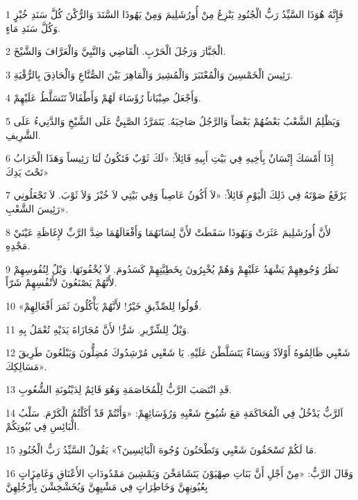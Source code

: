 \par 1 فَإِنَّهُ هُوَذَا السَّيِّدُ رَبُّ الْجُنُودِ يَنْزِعُ مِنْ أُورُشَلِيمَ وَمِنْ يَهُوذَا السَّنَدَ وَالرُّكْنَ كُلَّ سَنَدِ خُبْزٍ وَكُلَّ سَنَدِ مَاءٍ.
\par 2 الْجَبَّارَ وَرَجُلَ الْحَرْبِ. الْقَاضِي وَالنَّبِيَّ وَالْعَرَّافَ وَالشَّيْخَ.
\par 3 رَئِيسَ الْخَمْسِينَ وَالْمُعْتَبَرَ وَالْمُشِيرَ وَالْمَاهِرَ بَيْنَ الصُّنَّاعِ وَالْحَاذِقَ بِالرُّقْيَةِ.
\par 4 وَأَجْعَلُ صِبْيَاناً رُؤَسَاءَ لَهُمْ وَأَطْفَالاً تَتَسَلَّطُ عَلَيْهِمْ.
\par 5 وَيَظْلِمُ الشَّعْبُ بَعْضُهُمْ بَعْضاً وَالرَّجُلُ صَاحِبَهُ. يَتَمَرَّدُ الصَّبِيُّ عَلَى الشَّيْخِ وَالدَّنِيءُ عَلَى الشَّرِيفِ.
\par 6 إِذَا أَمْسَكَ إِنْسَانٌ بِأَخِيهِ فِي بَيْتِ أَبِيهِ قَائِلاً: «لَكَ ثَوْبٌ فَتَكُونُ لَنَا رَئِيساً وَهَذَا الْخَرَابُ تَحْتَ يَدِكَ»
\par 7 يَرْفَعُ صَوْتَهُ فِي ذَلِكَ الْيَوْمِ قَائِلاً: «لاَ أَكُونُ عَاصِباً وَفِي بَيْتِي لاَ خُبْزَ وَلاَ ثَوْبَ. لاَ تَجْعَلُونِي رَئِيسَ الشَّعْبِ».
\par 8 لأَنَّ أُورُشَلِيمَ عَثَرَتْ وَيَهُوذَا سَقَطَتْ لأَنَّ لِسَانَهُمَا وَأَفْعَالَهُمَا ضِدَّ الرَّبِّ لإِغَاظَةِ عَيْنَيْ مَجْدِهِ.
\par 9 نَظَرُ وُجُوهِهِمْ يَشْهَدُ عَلَيْهِمْ وَهُمْ يُخْبِرُونَ بِخَطِيَّتِهِمْ كَسَدُومَ. لاَ يُخْفُونَهَا. وَيْلٌ لِنُفُوسِهِمْ لأَنَّهُمْ يَصْنَعُونَ لأَنْفُسِهِمْ شَرّاً.
\par 10 «قُولُوا لِلصِّدِّيقِ خَيْرٌ! لأَنَّهُمْ يَأْكُلُونَ ثَمَرَ أَفْعَالِهِمْ.
\par 11 وَيْلٌ لِلشِّرِّيرِ. شَرٌّ! لأَنَّ مُجَازَاةَ يَدَيْهِ تُعْمَلُ بِهِ.
\par 12 شَعْبِي ظَالِمُوهُ أَوْلاَدٌ وَنِسَاءٌ يَتَسَلَّطْنَ عَلَيْهِ. يَا شَعْبِي مُرْشِدُوكَ مُضِلُّونَ وَيَبْلَعُونَ طَرِيقَ مَسَالِكِكَ».
\par 13 قَدِ انْتَصَبَ الرَّبُّ لِلْمُخَاصَمَةِ وَهُوَ قَائِمٌ لِدَيْنُونَةِ الشُّعُوبِ.
\par 14 اَلرَّبُّ يَدْخُلُ فِي الْمُحَاكَمَةِ مَعَ شُيُوخِ شَعْبِهِ وَرُؤَسَائِهِمْ: «وَأَنْتُمْ قَدْ أَكَلْتُمُ الْكَرْمَ. سَلْبُ الْبَائِسِ فِي بُيُوتِكُمْ.
\par 15 مَا لَكُمْ تَسْحَقُونَ شَعْبِي وَتَطْحَنُونَ وُجُوهَ الْبَائِسِينَ؟» يَقُولُ السَّيِّدُ رَبُّ الْجُنُودِ.
\par 16 وَقَالَ الرَّبُّ: «مِنْ أَجْلِ أَنَّ بَنَاتِ صِهْيَوْنَ يَتَشَامَخْنَ وَيَمْشِينَ مَمْدُودَاتِ الأَعْنَاقِ وَغَامِزَاتٍ بِعُيُونِهِنَّ وَخَاطِرَاتٍ فِي مَشْيِهِنَّ وَيُخَشْخِشْنَ بِأَرْجُلِهِنَّ
